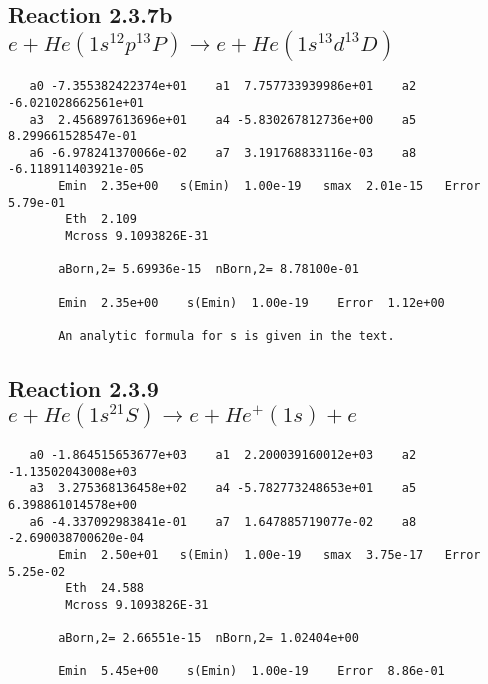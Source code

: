 \documentclass[12pt,dvipdfm]{article}
\begin{document}
\newpage
\subsection{
Reaction 2.3.7b $e + He(1s^12p^13P) \rightarrow e + He(1s^13d^13D)$}

















\begin{small}\begin{verbatim}
   a0 -7.355382422374e+01    a1  7.757733939986e+01    a2 -6.021028662561e+01
   a3  2.456897613696e+01    a4 -5.830267812736e+00    a5  8.299661528547e-01
   a6 -6.978241370066e-02    a7  3.191768833116e-03    a8 -6.118911403921e-05
       Emin  2.35e+00   s(Emin)  1.00e-19   smax  2.01e-15   Error  5.79e-01
        Eth  2.109
        Mcross 9.1093826E-31

       aBorn,2= 5.69936e-15  nBorn,2= 8.78100e-01

       Emin  2.35e+00    s(Emin)  1.00e-19    Error  1.12e+00

       An analytic formula for s is given in the text.
\end{verbatim}\end{small}




\newpage
\subsection{
Reaction 2.3.9 $   e + He(1s^21S) \rightarrow e + He^+(1s) + e$}




\begin{small}\begin{verbatim}
   a0 -1.864515653677e+03    a1  2.200039160012e+03    a2 -1.13502043008e+03
   a3  3.275368136458e+02    a4 -5.782773248653e+01    a5  6.398861014578e+00
   a6 -4.337092983841e-01    a7  1.647885719077e-02    a8 -2.690038700620e-04
       Emin  2.50e+01   s(Emin)  1.00e-19   smax  3.75e-17   Error  5.25e-02
        Eth  24.588
        Mcross 9.1093826E-31

       aBorn,2= 2.66551e-15  nBorn,2= 1.02404e+00

       Emin  5.45e+00    s(Emin)  1.00e-19    Error  8.86e-01
\end{verbatim}\end{small}
\end{document}
